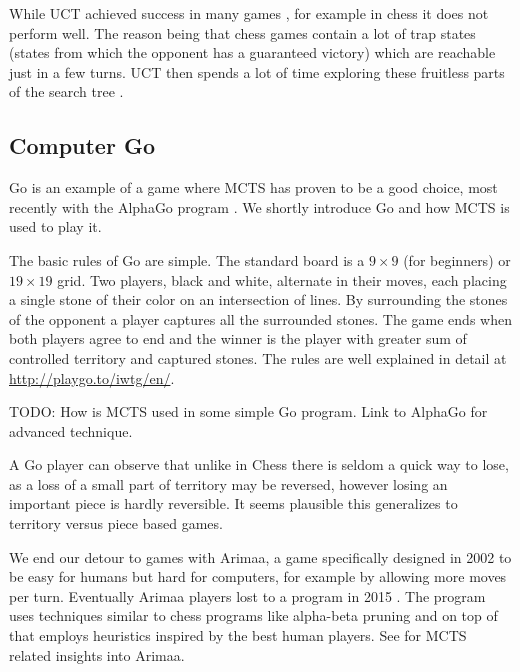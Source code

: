 While UCT achieved success in many games \parencite{mcts_survey},
for example in chess it does not perform well. The reason being that chess
games contain a lot of trap states (states from which the opponent
has a guaranteed victory) which are reachable just in a few turns. UCT
then spends a lot of time exploring these fruitless parts of the search
tree \parencite{mcts_vs_chess}.

\subsection{Computer Go}

Go is an example of a game where MCTS has proven to be a good choice,
most recently with the AlphaGo program \parencite{alphago}.
We shortly introduce Go and how MCTS is used to
play it.

The basic rules of Go are simple. The
standard board is a $9\times9$ (for beginners) or $19 \times 19$ grid.
Two players, black and white, alternate in their moves, each
placing a single stone of their color on an intersection of lines.
By surrounding the stones of the opponent a player captures all the
surrounded stones. The game ends when both players agree to end and the
winner is the player with greater sum of controlled territory and
captured stones.
The rules are well explained in detail at
\href{http://playgo.to/iwtg/en/}{http://playgo.to/iwtg/en/}.


TODO: How is MCTS used in some simple Go program.
Link to AlphaGo for advanced technique.

A Go player can observe that unlike in Chess there is seldom a quick way
to lose, as a loss of a small part of territory may be reversed, however
losing an important piece is hardly reversible. It seems plausible this
generalizes to territory versus piece based games.

We end our detour to games with Arimaa, a game specifically designed in
2002 to be easy for humans but hard for computers, for example by
allowing more moves per turn. Eventually Arimaa players lost to a
program in 2015 \parencite{arimaa}. The program uses techniques similar
to chess programs like alpha-beta pruning and on top of that employs
heuristics inspired by the best human players. See \parencite{jakl} for
MCTS related insights into Arimaa.
